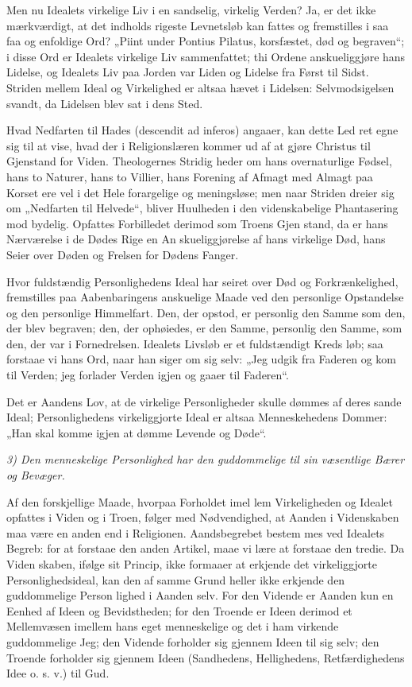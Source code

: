 \documentclass[12pt]{book}
\newcommand{\opage}[1]{\marginnote{\footnotesize\textit{[#1]}}}
\begin{document}
Men nu Idealets virkelige Liv i en sandselig, virkelig
Verden? Ja, er det ikke mærkværdigt, at det indholds\-%
rigeste Levnetsløb kan fattes og fremstilles i saa faa og
enfoldige Ord? „Piint under Pontius Pilatus, korsfæstet,
død og begraven“; i disse Ord er Idealets virkelige Liv
sammenfattet; thi Ordene anskueliggjøre hans Lidelse,
og Idealets Liv paa Jorden var Liden og Lidelse fra Først
til Sidst. Striden mellem Ideal og Virkelighed er altsaa
hævet i Lidelsen: Selvmodsigelsen svandt, da Lidelsen
blev sat i dens Sted.

\opage{151}\setcounter{footnote}{0}%
Hvad Nedfarten til Hades (descendit ad inferos)
angaaer, kan dette Led ret egne sig til at vise,
hvad der i Religionslæren kommer ud af at gjøre
Christus til Gjenstand for Viden. Theologernes Stridig\-%
heder om hans overnaturlige Fødsel, hans to Naturer,
hans to Villier, hans Forening af Afmagt med Almagt
paa Korset ere vel i det Hele forargelige og meningsløse;
men naar Striden dreier sig om „Nedfarten til Helvede“,
bliver Huulheden i den videnskabelige Phantasering mod\-%
bydelig. Opfattes Forbilledet derimod som Troens Gjen\-%
stand, da er hans Nærværelse i de Dødes Rige en An\-%
skueliggjørelse af hans virkelige Død, hans Seier over
Døden og Frelsen for Dødens Fanger.

Hvor fuldstændig Personlighedens Ideal har seiret over
Død og Forkrænkelighed, fremstilles paa Aabenbaringens
anskuelige Maade ved den personlige Opstandelse og den
personlige Himmelfart. Den, der opstod, er personlig den
Samme som den, der blev begraven; den, der ophøiedes,
er den Samme, personlig den Samme, som den, der var
i Fornedrelsen. Idealets Livsløb er et fuldstændigt Kreds\-%
løb; saa forstaae vi hans Ord, naar han siger om sig
selv: „Jeg udgik fra Faderen og kom til Verden; jeg
forlader Verden igjen og gaaer til Faderen“.

Det er Aandens Lov, at de virkelige Personligheder
skulle dømmes af deres sande Ideal; Personlighedens
virkeliggjorte Ideal er altsaa Menneskehedens Dommer:
„Han skal komme igjen at dømme Levende og Døde“.

\textit{3) Den menneskelige Personlighed har den guddommelige
til sin væsentlige Bærer og Bevæger.}

Af den forskjellige Maade, hvorpaa Forholdet imel\-%
lem Virkeligheden og Idealet opfattes i Viden og i Troen,
følger med Nødvendighed, at Aanden i Videnskaben maa
være en anden end i Religionen. Aandsbegrebet bestem\-%
mes ved Idealets Begreb: for at forstaae den anden
\opage{152}\setcounter{footnote}{0}%
Artikel, maae vi lære at forstaae den tredie. Da Viden\-%
skaben, ifølge sit Princip, ikke formaaer at erkjende det
virkeliggjorte Personlighedsideal, kan den af samme
Grund heller ikke erkjende den guddommelige Person\-%
lighed i Aanden selv. For den Vidende er Aanden kun
en Eenhed af Ideen og Bevidstheden; for den Troende
er Ideen derimod et Mellemvæsen imellem hans eget
menneskelige og det i ham virkende guddommelige Jeg;
den Vidende forholder sig gjennem Ideen til sig selv;
den Troende forholder sig gjennem Ideen (Sandhedens,
Hellighedens, Retfærdighedens Idee o. s. v.) til Gud.
\end{document}
